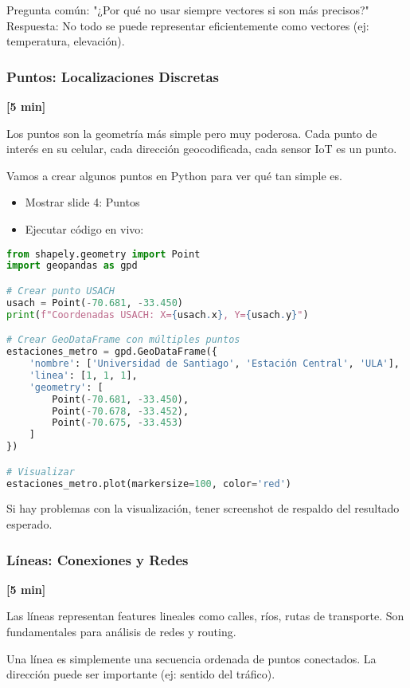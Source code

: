\documentclass[11pt,a4paper]{article}
\newcommand{\tiempo}[1]{\textcolor{timecolor}{\textbf{[#1]}}}
\newcommand{\decir}[1]{\begin{tcolorbox}[colback=blue!5,colframe=usachblue,title={DECIR}]#1\end{tcolorbox}}
\newcommand{\hacer}[1]{\begin{tcolorbox}[colback=green!5,colframe=green!50!black,title={HACER}]#1\end{tcolorbox}}
\newcommand{\nota}[1]{\begin{tcolorbox}[colback=yellow!10,colframe=orange,title={NOTA}]#1\end{tcolorbox}}
\newcommand{\alerta}[1]{\begin{tcolorbox}[colback=red!5,colframe=red,title={ALERTA}]#1\end{tcolorbox}}
\begin{document}
\alerta{
Pregunta común: "¿Por qué no usar siempre vectores si son más precisos?"
Respuesta: No todo se puede representar eficientemente como vectores (ej: temperatura, elevación).
}

\subsubsection{Puntos: Localizaciones Discretas} \tiempo{5 min}

\decir{
Los puntos son la geometría más simple pero muy poderosa. Cada punto de interés en su celular, cada dirección geocodificada, cada sensor IoT es un punto.

Vamos a crear algunos puntos en Python para ver qué tan simple es.
}

\hacer{
\begin{itemize}
    \item Mostrar slide 4: Puntos
    \item Ejecutar código en vivo:
\end{itemize}
}

\begin{lstlisting}[language=Python]
from shapely.geometry import Point
import geopandas as gpd

# Crear punto USACH
usach = Point(-70.681, -33.450)
print(f"Coordenadas USACH: X={usach.x}, Y={usach.y}")

# Crear GeoDataFrame con múltiples puntos
estaciones_metro = gpd.GeoDataFrame({
    'nombre': ['Universidad de Santiago', 'Estación Central', 'ULA'],
    'linea': [1, 1, 1],
    'geometry': [
        Point(-70.681, -33.450),
        Point(-70.678, -33.452),
        Point(-70.675, -33.453)
    ]
})

# Visualizar
estaciones_metro.plot(markersize=100, color='red')
\end{lstlisting}

\nota{
Si hay problemas con la visualización, tener screenshot de respaldo del resultado esperado.
}

\subsubsection{Líneas: Conexiones y Redes} \tiempo{5 min}

\decir{
Las líneas representan features lineales como calles, ríos, rutas de transporte. Son fundamentales para análisis de redes y routing.

Una línea es simplemente una secuencia ordenada de puntos conectados. La dirección puede ser importante (ej: sentido del tráfico).
}
\end{document}
